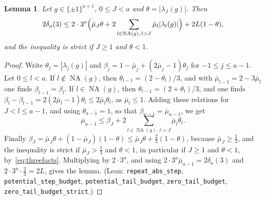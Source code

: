 \documentclass[11pt]{article}
\newtheorem{lemma}[theorem]{Lemma}
\theoremstyle{remark}
\newcommand{\NA}{\operatorname{NA}}
\begin{document}
\begin{lemma}\label{lem:tailbudget}
Let $g\in\{\pm1\}^{a+1}$, $0\le J<a$ and $\theta=|\lambda_J(g)|$. Then
\begin{equation}\label{eq:tailbudget}
2\delta_a(3)\le2\cdot3^a\Bigl(\bar\mu_J\theta+2\sum_{l\in\NA(g),\,l>J}
\bar\mu_l|\lambda_l(g)|\Bigr)+2L(1-\theta),
\end{equation}
and the inequality is strict if $J\ge1$ and $\theta<1$.
\end{lemma}
\begin{proof}
Write $\theta_j=|\lambda_j(g)|$ and $\beta_j=1-\bar\mu_j+(2\bar\mu_j-1)\theta_j$
for $-1\le j\le a-1$. Let $0\le l<a$. If $l\notin\NA(g)$, then
$\theta_{l-1}=(2-\theta_l)/3$, and with $\bar\mu_{l-1}=2-3\bar\mu_l$ one finds
$\beta_{l-1}=\beta_l$. If $l\in\NA(g)$, then $\theta_{l-1}=(2+\theta_l)/3$, and
one finds $\beta_l-\beta_{l-1}=2(2\bar\mu_l-1)\theta_l\le2\bar\mu_l\theta_l$, as
$\bar\mu_l\le1$. Adding these relations for $J<l\le a-1$, and using
$\theta_{a-1}=1$, so that $\beta_{a-1}=\bar\mu_{a-1}$, we get
\[
\bar\mu_{a-1}\le\beta_J+2\sum_{l\in\NA(g),\,l>J}\bar\mu_l\theta_l.
\]
Finally $\beta_J=\bar\mu_J\theta+(1-\bar\mu_J)(1-\theta)\le\bar\mu_J\theta+
\frac23(1-\theta)$, because $\bar\mu_J\ge\frac13$, and the inequality is strict
if $\bar\mu_J>\frac13$ and $\theta<1$, in particular if $J\ge1$ and $\theta<1$,
by~\eqref{eq:threefacts}. Multiplying by $2\cdot3^a$, and using
$2\cdot3^a\bar\mu_{a-1}=2\delta_a(3)$ and $2\cdot3^a\cdot\frac23=2L$, gives the
lemma. (Lean: \texttt{repeat\_abs\_step}, \texttt{potential\_step\_budget},
\texttt{potential\_tail\_budget}, \texttt{zero\_tail\_budget},
\texttt{zero\_tail\_budget\_strict}.)
\end{proof}
\end{document}
